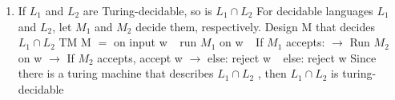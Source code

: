 \documentclass[11pt]{article}
\begin{document}
\begin{enumerate}
\begin{enumerate}
\item If $L_1$ and $L_2$ are Turing-decidable, so is $L_1\cap L_2$\newline 
For decidable languages $L_1$ and $L_2$, let $M_1$ and $M_2$ decide them, respectively. 
Design M that decides $L_1\cap L_2$ \newline 
TM M $=$ on input w \newline \newline  
$\ \ $ run $M_1$ on w \newline 
$\ \ $ If $M_1$ accepts:\newline 
$\rightarrow$ Run $M_2$ on w \newline 
$\rightarrow$ If $M_2$ accepts, accept w \newline 
$\rightarrow$ else: reject w\newline 
$\ \ $ else: reject w \newline \newline 
Since there is a turing machine that describes $L_1\cap L_2$ , then $L_1\cap L_2$  is turing-decidable
\end{enumerate}

\end{enumerate}
\end{document}
